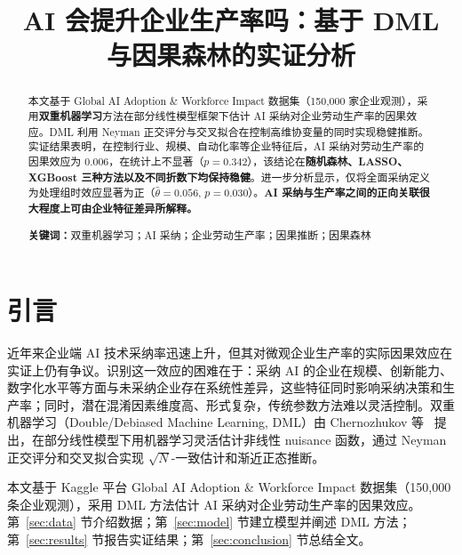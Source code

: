 \documentclass[UTF8,11pt,a4paper]{ctexart}
\begin{document}
\title{\vspace{-2em}\textbf{AI 会提升企业生产率吗：基于 DML 与因果森林的实证分析}}
\author{}
\date{}
\maketitle
\vspace{-3em}

\begin{abstract}
\noindent 本文基于 Global AI Adoption \& Workforce Impact 数据集（150{,}000 家企业观测），采用\textbf{双重机器学习}方法在部分线性模型框架下估计 AI 采纳对企业劳动生产率的因果效应。DML 利用 Neyman 正交评分与交叉拟合在控制高维协变量的同时实现稳健推断。实证结果表明，在控制行业、规模、自动化率等企业特征后，AI 采纳对劳动生产率的因果效应为 0.006，在统计上不显著（$p = 0.342$），该结论在\textbf{随机森林、LASSO、XGBoost 三种方法以及不同折数下均保持稳健}。进一步分析显示，仅将全面采纳定义为处理组时效应显著为正（$\hat\theta = 0.056$, $p = 0.030$）。\textbf{AI 采纳与生产率之间的正向关联很大程度上可由企业特征差异所解释。}

\medskip
\noindent\textbf{关键词：}双重机器学习；AI 采纳；企业劳动生产率；因果推断；因果森林
\end{abstract}

\section{引言}\label{sec:intro}

近年来企业端 AI 技术采纳率迅速上升，但其对微观企业生产率的实际因果效应在实证上仍有争议。识别这一效应的困难在于：采纳 AI 的企业在规模、创新能力、数字化水平等方面与未采纳企业存在系统性差异，这些特征同时影响采纳决策和生产率；同时，潜在混淆因素维度高、形式复杂，传统参数方法难以灵活控制。双重机器学习（Double/Debiased Machine Learning, DML）由 Chernozhukov 等~\cite{chernozhukov2018double} 提出，在部分线性模型下用机器学习灵活估计非线性 nuisance 函数，通过 Neyman 正交评分和交叉拟合实现 $\sqrt{N}$-一致估计和渐近正态推断。

本文基于 Kaggle 平台 Global AI Adoption \& Workforce Impact 数据集（150{,}000 条企业观测），采用 DML 方法估计 AI 采纳对企业劳动生产率的因果效应。第~\ref{sec:data} 节介绍数据；第~\ref{sec:model} 节建立模型并阐述 DML 方法；第~\ref{sec:results} 节报告实证结果；第~\ref{sec:conclusion} 节总结全文。
\end{document}
